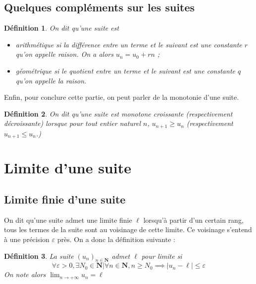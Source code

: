 \documentclass[12pt,a4paper]{article}
\newcommand{\N}{\mathbf{N}}
\newcommand{\vabs}[1]{\left\lvert #1 \right\rvert}
\theoremstyle{break}
\newtheorem{definition}{Définition}
\theoremstyle{plain}
\theoremstyle{nonumberplain}
\theoremstyle{nonumberbreak}
\begin{document}
\subsection{Quelques compléments sur les suites}

\begin{definition}
  On dit qu'une suite est
  \begin{itemize}
    \item arithmétique si la différence entre un terme et le suivant est
      une constante $r$ qu'on appelle raison. On a alors $u_n = u_0 +
      rn$ ;
    \item géométrique si le quotient entre un terme et le suivant est
      une constante $q$ qu'on appelle la raison.
  \end{itemize}
\end{definition}



Enfin, pour conclure cette partie, on peut parler de la monotonie d'une
suite.

\begin{definition}
  On dit qu'une suite est monotone croissante (respectivement
  décroissante) lorsque pour tout entier naturel $n$, $u_{n+1} \geq u_n$
  (respectivement $u_{n+1} \leq u_n$.)
\end{definition}

\section{Limite d'une suite}

\subsection{Limite finie d'une suite}

On dit qu'une suite admet une limite finie $\ell$ lorsqu'à partir d'un
certain rang, tous les termes de la suite sont au voisinage de cette
limite. Ce voisinage s'entend à une précision $\varepsilon$ près. On a
donc la définition suivante :
\begin{definition}\label{def:suite:superieur}
  La suite $(u_n)_{n\in\N}$ admet $\ell$ pour limite si \[ \forall
    \varepsilon > 0, \exists N_0\in\N | \forall n \in\N , n\geq N_0
  \implies \vabs{u_n - \ell} \leq \varepsilon \]
  On note alors $\lim_{n\to+\infty} u_n = \ell$
\end{definition}
\end{document}
